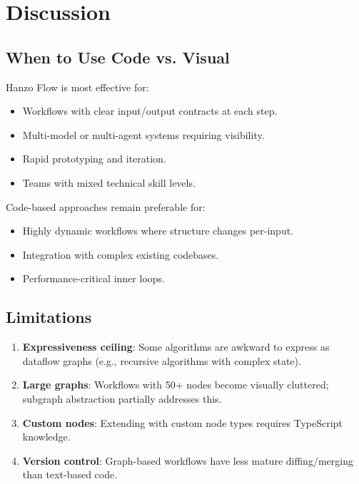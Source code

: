 \documentclass[11pt,twocolumn]{article}
\begin{document}
\section{Discussion}
\label{sec:discussion}

\subsection{When to Use Code vs. Visual}

Hanzo Flow is most effective for:
\begin{itemize}[leftmargin=1.1em]
    \item Workflows with clear input/output contracts at each step.
    \item Multi-model or multi-agent systems requiring visibility.
    \item Rapid prototyping and iteration.
    \item Teams with mixed technical skill levels.
\end{itemize}

Code-based approaches remain preferable for:
\begin{itemize}[leftmargin=1.1em]
    \item Highly dynamic workflows where structure changes per-input.
    \item Integration with complex existing codebases.
    \item Performance-critical inner loops.
\end{itemize}

\subsection{Limitations}

\begin{enumerate}[leftmargin=1.4em]
    \item \textbf{Expressiveness ceiling}: Some algorithms are awkward to express as dataflow graphs (e.g., recursive algorithms with complex state).
    \item \textbf{Large graphs}: Workflows with 50+ nodes become visually cluttered; subgraph abstraction partially addresses this.
    \item \textbf{Custom nodes}: Extending with custom node types requires TypeScript knowledge.
    \item \textbf{Version control}: Graph-based workflows have less mature diffing/merging than text-based code.
\end{enumerate}
\end{document}
